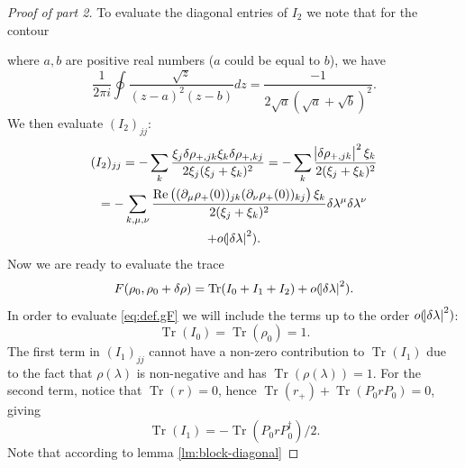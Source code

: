 \documentclass[american,aps,pra,reprint,floatfix,nofootinbib,superscriptaddress]{revtex4-2}
\DeclareMathOperator{\Tr}{Tr}
\DeclareMathOperator{\real}{Re}
\begin{document}
\begin{proof}[Proof of part 2]
  To evaluate the diagonal entries of $I_2$ we note that for the contour
  \begin{center}
  \end{center}
  where $a,b$ are positive real numbers ($a$ could be equal to $b$),
  we have
  \begin{equation}
    \frac1{2\pi i} \oint \frac{\sqrt{z}}{(z-a)^2(z-b)} dz = \frac{-1}{2\sqrt{a}(\sqrt{a} + \sqrt{b})^2}.
  \end{equation}
  We then evaluate $(I_2)_{jj}$:
  \begin{multline}
    \label{eq:I2jj}
    (I_2)_{jj} = -\sum_k \frac{\xi_j \delta \rho_{{+},jk}
      \xi_k \delta \rho_{{+},kj}}{2\xi_j (\xi_j + \xi_k)^2}
    = -\sum_k \frac{\abs{\delta \rho_{{+},jk}}^2 \xi_k}{2(\xi_j + \xi_k)^2} \\
    = -\sum_{k,\mu,\nu} \frac{
        \real\left(
          (\partial_\mu\rho_{+}(0))_{jk}(\partial_\nu\rho_{+}(0))_{kj}
        \right) \xi_k
      }{2(\xi_j + \xi_k)^2} \delta\lambda^\mu\delta\lambda^\nu \\
      + o(\abs{\delta \lambda}^2).
  \end{multline}
  Now we are ready to evaluate the trace
  \begin{equation}
    F(\rho_0, \rho_0 + \delta \rho) =
      \Tr(I_0 + I_1 + I_2) + o(\abs{\delta\lambda}^2).
  \end{equation}
  In order to evaluate \eqref{eq:def.gF} we will include the terms up to
  the order $o(\abs{\delta \lambda}^2)$:
  \begin{equation}
    \Tr(I_0) = \Tr(\rho_0) = 1.
  \end{equation}
  The first term in $(I_1)_{jj}$ cannot have a non-zero contribution to
  $\Tr(I_1)$ due to the fact that $\rho(\lambda)$ is non-negative and
  has $\Tr(\rho(\lambda)) = 1$. For the second term, notice that $\Tr(r) = 0$,
  hence $\Tr(r_{+}) + \Tr(P_0 r P_0) = 0$, giving
  \begin{equation}
    \label{eq:TrI1}
    \Tr(I_1) = - \Tr(P_0 r P_0^{\dagger}) / 2.
  \end{equation}
  Note that according to lemma \ref{lm:block-diagonal}

\end{proof}
\end{document}
